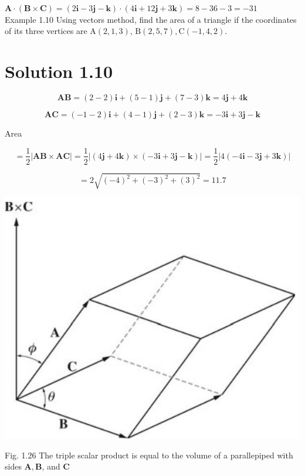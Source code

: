 \documentclass[10pt]{article}
\begin{document}
$\mathbf{A} \cdot(\mathbf{B} \times \mathbf{C})=(2 \mathbf{i}-3 \mathbf{j}-\mathbf{k}) \cdot(4 \mathbf{i}+12 \mathbf{j}+3 \mathbf{k})=8-36-3=-31$\\
Example 1.10 Using vectors method, find the area of a triangle if the coordinates of its three vertices are $\mathrm{A}(2,1,3)$, $\mathrm{B}(2,5,7), \mathrm{C}(-1,4,2)$.

\section*{Solution 1.10}
$$
\mathbf{A B}=(2-2) \mathbf{i}+(5-1) \mathbf{j}+(7-3) \mathbf{k}=4 \mathbf{j}+4 \mathbf{k}
$$

$$
\mathbf{A C}=(-1-2) \mathbf{i}+(4-1) \mathbf{j}+(2-3) \mathbf{k}=-3 \mathbf{i}+3 \mathbf{j}-\mathbf{k}
$$

Area

$$
=\frac{1}{2}|\mathbf{A B} \times \mathbf{A C}|=\frac{1}{2}|(4 \mathbf{j}+4 \mathbf{k}) \times(-3 \mathbf{i}+3 \mathbf{j}-\mathbf{k})|=\frac{1}{2}|4(-4 \mathbf{i}-3 \mathbf{j}+3 \mathbf{k})|
$$

$$
=2 \sqrt{(-4)^{2}+(-3)^{2}+(3)^{2}}=11.7
$$

\begin{center}
\includegraphics[max width=\textwidth]{2024_09_13_db1f357d2aad0a03eb2eg-022}
\end{center}

Fig. 1.26 The triple scalar product is equal to the volume of a parallepiped with sides $\mathbf{A}, \mathbf{B}$, and $\mathbf{C}$
\end{document}
